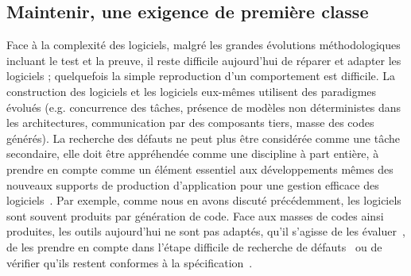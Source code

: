 \documentclass[11pt]{article}
\newcommand{\mynote}[3][black]{\textcolor{#1}{\fbox{\bfseries\sffamily\scriptsize{#2}}
{\small$\blacktriangleright$\textsf{\emph{#3}}$\blacktriangleleft$}}}
\newcommand{\TODO}[1]{\mynote[red]{TODO}{#1}}
\newcommand{\defi}[1]{\cite[défi]{#1}}
\begin{document}
\subsection{Maintenir, une exigence de première classe \label{ss:maintenance:debugger}}
Face à la complexité des logiciels, malgré les grandes évolutions méthodologiques incluant le test et la preuve, il reste difficile aujourd'hui de réparer et adapter les logiciels ; quelquefois la simple reproduction d'un comportement est difficile. 
La construction des logiciels et les 
logiciels eux-mêmes utilisent des paradigmes évolués (e.g. concurrence des tâches, présence de modèles  non déterministes dans les architectures, communication par des composants tiers, masse des codes générés). 
La  recherche des défauts ne peut plus être considérée comme une tâche secondaire, elle doit être appréhendée comme une discipline à part entière, à prendre en compte comme un élément essentiel aux développements mêmes des nouveaux supports de production d'application pour une gestion efficace des logiciels~\defi{debuggers}.
Par exemple, comme nous en avons discuté précédemment, les logiciels sont souvent produits par génération de code. Face aux masses de codes ainsi produites, les outils aujourd'hui ne sont pas adaptés, qu'il s'agisse de les évaluer~\defi{coevolution}, de les prendre en compte dans l'étape difficile de recherche de défauts~\defi{debuggers} ou de vérifier qu'ils restent conformes à la spécification~\defi{sansBug}.





\end{document}
